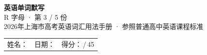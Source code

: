 \documentclass[10pt,a4paper]{article}
\begin{document}
\pagestyle{plain}

\begin{center}
{\LARGE\bfseries 英语单词默写}\\[0.22em]
{\large R 字母 · 第 3 / 5 份}\\[0.18em]
{\small 2026年上海市高考英语词汇用法手册 · 参照普通高中英语课程标准}
\end{center}

\vspace{0.25em}
\noindent\begin{tabular}{@{}p{}@{}p{}@{}p{}@{}}
姓名：\underline{\hspace{2.0cm}} & 日期：\underline{\hspace{2.0cm}} & 得分：\underline{\hspace{1.3cm}}\,/\,45 \\
\end{tabular}

\vspace{0.3em}

\vspace{0.08em}
\end{document}
